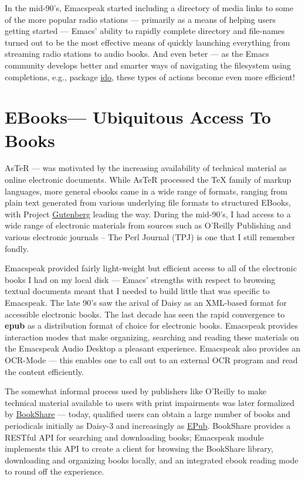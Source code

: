 \documentclass[11pt]{article}
\begin{document}
In the mid-90's, Emacspeak started including a directory of media
links to some of the more popular radio stations — primarily as a
means of helping users getting started — Emacs' ability to
rapidly complete directory and file-names turned out to be the
most effective means of quickly launching everything from
streaming radio stations to audio books. And even beter — as the
Emacs community develops better and smarter ways of navigating
the filesystem using completions, e.g., package \uline{ido}, these
types of actions become even more efficient!

\section{EBooks—   Ubiquitous Access To Books}
\label{sec-11}


AsTeR — was motivated by the increasing availability of technical
material as online electronic documents. While AsTeR processed
the \TeX{} family of markup languages, more general ebooks came in a
wide range of formats, ranging from plain text generated from
various underlying file formats to structured EBooks, with
Project \href{http://www.gutenberg.org/}{Gutenberg} leading the
way. During the mid-90's, I had access to a wide range of
electronic materials from sources such as O'Reilly Publishing and
various electronic journals -- The Perl Journal (TPJ) is one that
I still remember fondly.

Emacspeak provided fairly light-weight but efficient access to
all of the electronic books I had on my local disk — Emacs'
strengths with respect to browsing textual documents meant that I
needed to build little that was specific to Emacspeak. The late
90's saw the arival of Daisy as an XML-based format for
accessible electronic books. The last decade has seen the rapid
convergence to \textbf{epub} as a distribution format of choice for
electronic books. Emacspeak provides interaction modes that make
organizing, searching and reading these materials on the
Emacspeak Audio Desktop a pleasant experience. Emacspeak also
provides an OCR-Mode — this enables one to call out to an
external OCR program and read the content efficiently.

The somewhat informal process used by publishers like O'Reilly to
make technical material available to users with print impairments
was later formalized by \href{https://www.bookshare.org/}{BookShare} — today, qualified users can
obtain a large number of books and periodicals initially as
Daisy-3 and increasingly as \uline{EPub}. BookShare provides a RESTful
API for searching and downloading books; Emacspeak module
$_{\text{ }}$implements this API to create a client for
browsing the BookShare library, downloading and organizing books
locally, and an integrated ebook reading mode to round off the
experience.
\end{document}
